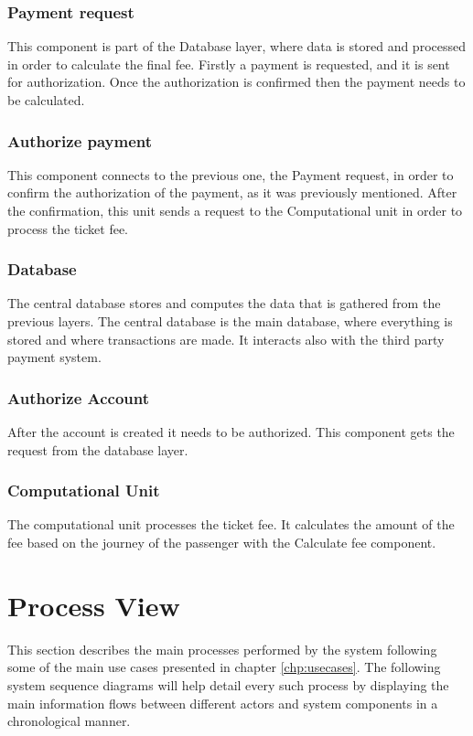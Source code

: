 \subsubsection{Payment request} 
This component is part of the Database layer, where data is stored and processed in order to calculate the final fee. 
Firstly a payment is requested, and it is sent for authorization. Once the authorization is confirmed then the payment needs to  be calculated.

\subsubsection{Authorize payment}
This component connects to the previous one, the Payment request, in order to confirm the authorization of the payment, as it was previously mentioned. After the confirmation, this unit sends a request to the Computational unit in order to process the ticket fee.

\subsubsection{Database}
The central database stores and computes the data that is gathered from the previous layers. The central database is the main database, where everything is stored and where transactions are made. It interacts also with the third party payment system. 

\subsubsection{Authorize Account}
After the account is created it needs to be authorized. This component gets the request from the database layer. 

\subsubsection{Computational Unit}
The computational unit processes the ticket fee. It calculates the amount of the fee based on the journey of the passenger with the Calculate fee component.




\section{Process View}
This section describes the main processes performed by the system following some of the main use cases presented in chapter \ref{chp:usecases}. The following system sequence diagrams will help detail every such process by displaying the main information flows between different actors and system components in a chronological manner.

